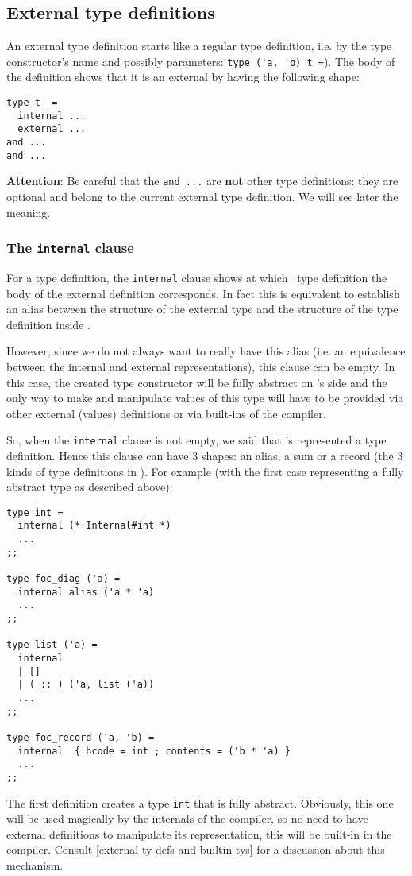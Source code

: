 \subsection{External type definitions}
An external type definition starts like a regular type definition,
i.e. by the type constructor's name and possibly parameters:
\lstinline!type ('a, 'b) t =!). The body of the definition shows that
it is an external by having the following shape:

{\footnotesize
\begin{lstlisting}
type t  =
  internal ...
  external ...
and ...
and ...
\end{lstlisting}
}

{\bf Attention}: Be careful that the {\tt and ...} are {\bf not} other
type definitions: they are optional and belong to the current external
type definition. We will see later the meaning.

\subsubsection{The {\tt internal} clause}
For a type definition, the {\tt internal} clause shows at which
\focalize\ type definition the body of the external definition
corresponds. In fact this is equivalent to establish an alias between
the structure of the external type and the structure of the type
definition inside \focalize.

However, since we do not always want to really have this alias
(i.e. an equivalence between the internal and external
representations), this clause can be empty. In this case, the created
type constructor will be fully abstract on \focalize's side and the
only way to make and manipulate values of this type will have to be
provided via other external (values) definitions or via built-ins of
the compiler.

\medskip
So, when the {\tt internal} clause is not empty, we said that is
represented a type definition. Hence this clause can have 3 shapes: an
alias, a sum or a record (the 3 kinds of type definitions in
\focalize). For example (with the first case representing a fully
abstract type as described above):

{\footnotesize
\begin{lstlisting}[title=External type definitions]
type int =
  internal (* Internal#int *)
  ...
;;

type foc_diag ('a) =
  internal alias ('a * 'a)
  ...
;;

type list ('a) =
  internal
  | []
  | ( :: ) ('a, list ('a))
  ...
;;

type foc_record ('a, 'b) =
  internal  { hcode = int ; contents = ('b * 'a) }
  ...
;;
\end{lstlisting}
}
The first definition creates a type {\tt int} that is fully
abstract. Obviously, this one will be used magically by the internals
of the compiler, so no need to have external definitions to manipulate
its representation, this will be built-in in the compiler. Consult
\ref{external-ty-defs-and-builtin-tys} for a discussion about this
mechanism.

